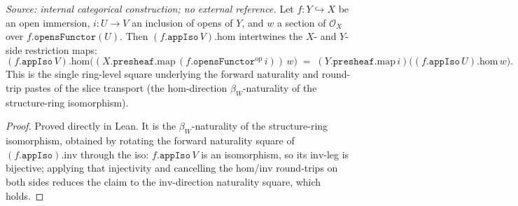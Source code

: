 \begin{lemma}


  \label{lem:appiso_hom_naturality_apply}
  \textit{Source: internal categorical construction; no external reference.}
  Let \(f : Y \hookrightarrow X\) be an open immersion, \(i : U \to V\) an inclusion of opens of
  \(Y\), and \(w\) a section of \(\mathcal{O}_X\) over \(f.\mathtt{opensFunctor}(U)\). Then
  \((f.\mathtt{appIso}\,V).\mathrm{hom}\) intertwines the \(X\)- and \(Y\)-side restriction maps:
  \[
    (f.\mathtt{appIso}\,V).\mathrm{hom}\bigl(
      (X.\mathtt{presheaf}.\mathrm{map}\,(f.\mathtt{opensFunctor}^{\mathrm{op}}\,i))\,w\bigr)
      \;=\;
    (Y.\mathtt{presheaf}.\mathrm{map}\,i)\bigl((f.\mathtt{appIso}\,U).\mathrm{hom}\,w\bigr).
  \]
  This is the single ring-level square underlying the forward naturality and round-trip pastes
  of the slice transport (the \(\mathrm{hom}\)-direction \(\beta_W\)-naturality of the
  structure-ring isomorphism).
\end{lemma}
\begin{proof}


\leanok
  Proved directly in Lean. It is the \(\beta_W\)-naturality of the structure-ring isomorphism,
  obtained by rotating the forward naturality square of \((f.\mathtt{appIso}).\mathrm{inv}\)
  through the iso: \(f.\mathtt{appIso}\,V\) is an isomorphism, so its \(\mathrm{inv}\)-leg is
  bijective; applying that injectivity and cancelling the \(\mathrm{hom}\)/\(\mathrm{inv}\)
  round-trips on both sides reduces the claim to the \(\mathrm{inv}\)-direction naturality
  square, which holds.
\end{proof}

